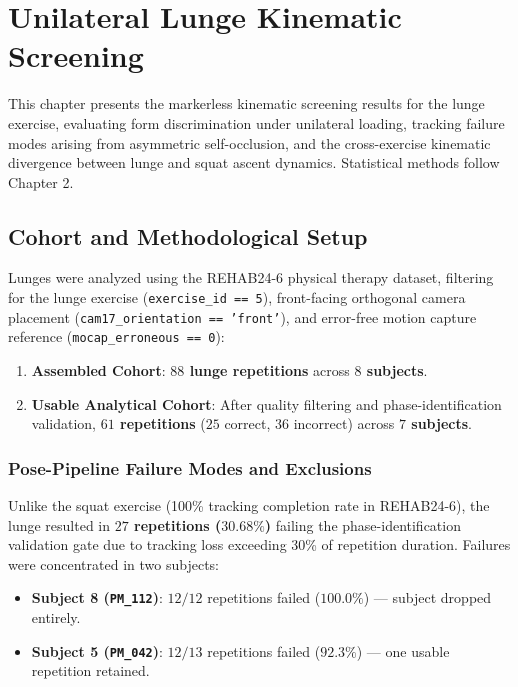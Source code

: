 \chapter{Unilateral Lunge Kinematic Screening}
\label{ch:lunge}



This chapter presents the markerless kinematic screening results for the lunge exercise, evaluating form discrimination under unilateral loading, tracking failure modes arising from asymmetric self-occlusion, and the cross-exercise kinematic divergence between lunge and squat ascent dynamics. Statistical methods follow Chapter 2.



\section{Cohort and Methodological Setup}
\label{sec:5-1-cohort-and-methodological-setup}


Lunges were analyzed using the REHAB24-6 physical therapy dataset, filtering for the lunge exercise (\texttt{exercise\_id == 5}), front-facing orthogonal camera placement (\texttt{cam17\_orientation == 'front'}), and error-free motion capture reference (\texttt{mocap\_erroneous == 0}):

\begin{enumerate}
  \item \textbf{Assembled Cohort}: \textbf{$88$ lunge repetitions} across \textbf{$8$ subjects}.
  \item \textbf{Usable Analytical Cohort}: After quality filtering and phase-identification validation, \textbf{$61$ repetitions} ($25$ correct, $36$ incorrect) across \textbf{$7$ subjects}.
\end{enumerate}

\subsection{Pose-Pipeline Failure Modes and Exclusions}
\label{sec:5-1-1-pose-pipeline-failure-modes-and-exclusions}

Unlike the squat exercise (100\% tracking completion rate in REHAB24-6), the lunge resulted in \textbf{$27$ repetitions ($30.68\%$)} failing the phase-identification validation gate due to tracking loss exceeding 30\% of repetition duration. Failures were concentrated in two subjects:
\begin{itemize}
  \item \textbf{Subject 8 (\texttt{PM\_112})}: $12/12$ repetitions failed ($100.0\%$) — subject dropped entirely.
  \item \textbf{Subject 5 (\texttt{PM\_042})}: $12/13$ repetitions failed ($92.3\%$) — one usable repetition retained.
\end{itemize}

